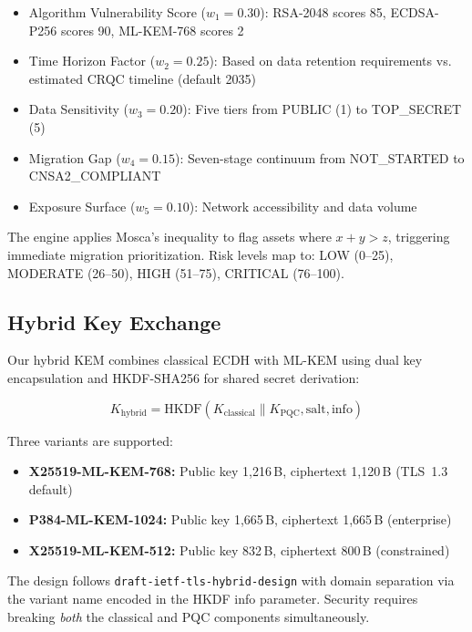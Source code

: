 \documentclass[conference,10pt]{IEEEtran}
\newcommand{\mlkem}{\textsf{ML-KEM}}
\begin{document}
\begin{itemize}
    \item Algorithm Vulnerability Score ($w_1 = 0.30$): RSA-2048 scores 85, ECDSA-P256 scores 90, ML-KEM-768 scores 2
    \item Time Horizon Factor ($w_2 = 0.25$): Based on data retention requirements vs. estimated CRQC timeline (default 2035)
    \item Data Sensitivity ($w_3 = 0.20$): Five tiers from PUBLIC (1) to TOP\_SECRET (5)
    \item Migration Gap ($w_4 = 0.15$): Seven-stage continuum from NOT\_STARTED to CNSA2\_COMPLIANT
    \item Exposure Surface ($w_5 = 0.10$): Network accessibility and data volume
\end{itemize}

The engine applies Mosca's inequality to flag assets where $x + y > z$, triggering immediate migration prioritization. Risk levels map to: LOW (0--25), MODERATE (26--50), HIGH (51--75), CRITICAL (76--100).

\subsection{Hybrid Key Exchange}

Our hybrid KEM combines classical ECDH with \mlkem{} using dual key encapsulation and HKDF-SHA256 for shared secret derivation:

\begin{equation}
    K_{\text{hybrid}} = \text{HKDF}(K_{\text{classical}} \| K_{\text{PQC}}, \text{salt}, \text{info})
\end{equation}

Three variants are supported:

\begin{itemize}
    \item \textbf{X25519-\mlkem{}-768:} Public key 1{,}216\,B, ciphertext 1{,}120\,B (TLS~1.3 default)
    \item \textbf{P384-\mlkem{}-1024:} Public key 1{,}665\,B, ciphertext 1{,}665\,B (enterprise)
    \item \textbf{X25519-\mlkem{}-512:} Public key 832\,B, ciphertext 800\,B (constrained)
\end{itemize}

\noindent The design follows \texttt{draft-ietf-tls-hybrid-design} with domain separation via the variant name encoded in the HKDF info parameter. Security requires breaking \emph{both} the classical and PQC components simultaneously.
\end{document}
